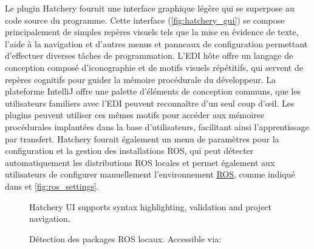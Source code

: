 {Le plugin Hatchery fournit une interface graphique légère qui se superpose au code source du programme. Cette interface (\autoref{fig:hatchery_gui}) se compose principalement de simples repères visuels tels que la mise en évidence de texte, l'aide à la navigation et d'autres menus et panneaux de configuration permettant d'effectuer diverses tâches de programmation. L'EDI hôte offre un langage de conception composé d'iconographie et de motifs visuels répétitifs, qui servent de repères cognitifs pour guider la mémoire procédurale du développeur. La plateforme IntelliJ offre une palette d'éléments de conception communs, que les utilisateurs familiers avec l'EDI peuvent reconnaître d'un seul coup d'œil. Les plugins peuvent utiliser ces mêmes motifs pour accéder aux mémoires procédurales implantées dans la base d'utilisateurs, facilitant ainsi l'apprentissage par transfert. Hatchery fournit également un menu de paramètres pour la configuration et la gestion des installations ROS, qui peut détecter automatiquement les distributions ROS locales et permet également aux utilisateurs de configurer manuellement l'environnement \href{https://wiki.ros.org/ROS/Tutorials/InstallingandConfiguringROSEnvironment}{ROS}, comme indiqué dans et \autoref{fig:ros_settings}.
%
\begin{figure}[b]
\centering
{}
\caption{Hatchery UI supports syntax highlighting, validation and project navigation.}
\label{fig:hatchery_gui}
\end{figure}
%
\begin{figure}
\centering
{}
\caption{Détection des packages ROS locaux. Accessible via: }
\label{fig:ros_settings}
\end{figure}

}
